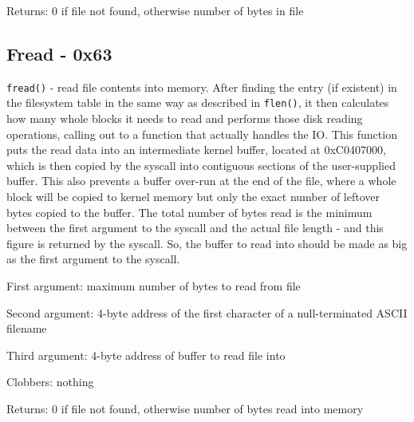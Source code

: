 \documentclass[12pt,a4paper]{report}
\begin{document}
Returns: 0 if file not found, otherwise number of bytes in file

\subsection*{Fread - 0x63}
\texttt{fread()} - read file contents into memory. After finding the entry (if existent) in the filesystem table in the same way as described in \texttt{flen()}, it then calculates how many whole blocks it needs to read and performs those disk reading operations, calling out to a function that actually handles the IO. This function puts the read data into an intermediate kernel buffer, located at 0xC0407000, which is then copied by the syscall into contiguous sections of the user-supplied buffer. This also prevents a buffer over-run at the end of the file, where a whole block will be copied to kernel memory but only the exact number of leftover bytes copied to the buffer. The total number of bytes read is the minimum between the first argument to the syscall and the actual file length - and this figure is returned by the syscall. So, the buffer to read into should be made as big as the first argument to the syscall.

First argument: maximum number of bytes to read from file

Second argument: 4-byte address of the first character of a null-terminated ASCII filename

Third argument: 4-byte address of buffer to read file into

Clobbers: nothing

Returns: 0 if file not found, otherwise number of bytes read into memory
\end{document}
